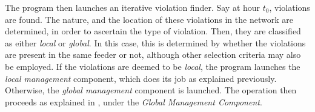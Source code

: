 The program then launches an iterative violation finder. Say at hour $t_0$, violations are found. The nature, and the location of these violations in the network are determined, in order to ascertain the type of violation. Then, they are classified as either \emph{local} or \emph{global}. In this case, this is determined by whether the violations are present in the same feeder or not, although other selection criteria may also be employed. If the violations are deemed to be \emph{local}, the program launches the \emph{local management} component, which does its job as explained previously. Otherwise, the \emph{global management} component is launched. The operation then proceeds as explained in , under the \emph{Global Management Component}.